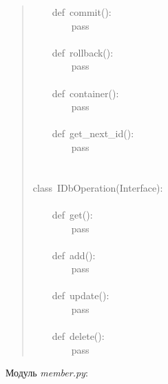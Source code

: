 \documentclass[a4paper,openany,twoside,final]{book}
\providecommand*{\DUroletitlereference}[1]{\textsl{#1}}
\begin{document}
\begin{quote}
{~~~~def~commit():\\
~~~~~~~~pass\\
~\\
~~~~def~rollback():\\
~~~~~~~~pass\\
~\\
~~~~def~container():\\
~~~~~~~~pass\\
~\\
~~~~def~get\_next\_id():\\
~~~~~~~~pass\\
~\\
~\\
class~IDbOperation(Interface):\\
~\\
~~~~def~get():\\
~~~~~~~~pass\\
~\\
~~~~def~add():\\
~~~~~~~~pass\\
~\\
~~~~def~update():\\
~~~~~~~~pass\\
~\\
~~~~def~delete():\\
~~~~~~~~pass
}
\end{quote}

Модуль \DUroletitlereference{member.py}:
\end{document}
